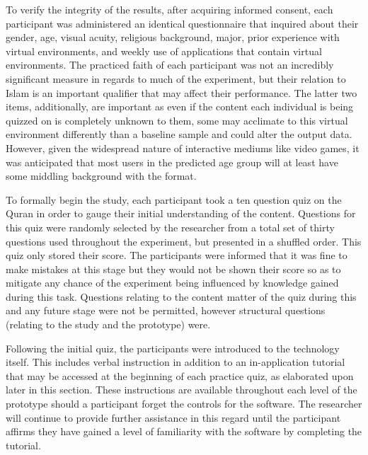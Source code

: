 \documentclass{vgtc}                          %
\begin{document}
To verify the integrity of the results, after acquiring informed consent, each participant was administered an identical questionnaire that inquired about their gender, age, visual acuity, religious background, major, prior experience with virtual environments, and weekly use of applications that contain virtual environments. The practiced faith of each participant was not an incredibly significant measure in regards to much of the experiment, but their relation to Islam is an important qualifier that may affect their performance. The latter two items, additionally, are important as even if the content each individual is being quizzed on is completely unknown to them, some may acclimate to this virtual environment differently than a baseline sample and could alter the output data. However, given the widespread nature of interactive mediums like video games, it was anticipated that most users in the predicted age group will at least have some middling background with the format.

To formally begin the study, each participant took a ten question quiz on the Quran in order to gauge their initial understanding of the content. Questions for this quiz were randomly selected by the researcher from a total set of thirty questions used throughout the experiment, but presented in a shuffled order. This quiz only stored their score. The participants were informed that it was fine to make mistakes at this stage but they would not be shown their score so as to mitigate any chance of the experiment being influenced by knowledge gained during this task. Questions relating to the content matter of the quiz during this and any future stage were not be permitted, however structural questions (relating to the study and the prototype) were.

Following the initial quiz, the participants were introduced to the technology itself. This includes verbal instruction in addition to an in-application tutorial that may be accessed at the beginning of each practice quiz, as elaborated upon later in this section. These instructions are available throughout each level of the prototype should a participant forget the controls for the software. The researcher will continue to provide further assistance in this regard until the participant affirms they have gained a level of familiarity with the software by completing the tutorial. 
\end{document}
